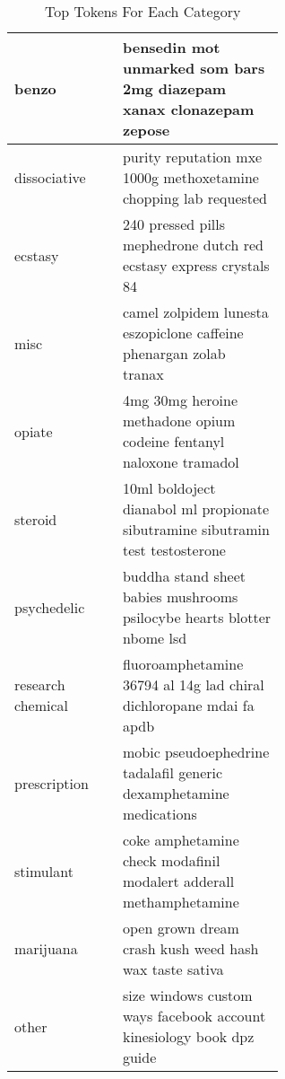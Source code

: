 \begin{table}[!ht]
    \begin{center}
        \begin{tabular}{| l | p{0.6\linewidth} |}
        \hline
        benzo & bensedin mot unmarked som bars 2mg diazepam xanax clonazepam zepose \\
        \hline
        dissociative &  purity reputation mxe 1000g methoxetamine chopping lab requested \\
        \hline
        ecstasy & 240 pressed pills mephedrone dutch red ecstasy express crystals 84 \\
        \hline
        misc & camel zolpidem lunesta eszopiclone caffeine phenargan zolab tranax  \\
        \hline
        opiate & 4mg 30mg heroine methadone opium codeine fentanyl naloxone tramadol \\
        \hline
        steroid & 10ml boldoject dianabol ml propionate sibutramine sibutramin test testosterone \\
        \hline
        psychedelic & buddha stand sheet babies mushrooms psilocybe hearts blotter nbome lsd \\
        \hline
        research chemical & fluoroamphetamine 36794 al 14g lad chiral dichloropane mdai fa apdb \\
        \hline
        prescription & mobic pseudoephedrine tadalafil generic dexamphetamine medications \\
        \hline
        stimulant & coke amphetamine check modafinil modalert adderall methamphetamine \\
        \hline
        marijuana & open grown dream crash kush weed hash wax taste sativa \\
        \hline
        other & size windows custom ways facebook account kinesiology book dpz guide \\
        \hline
        \end{tabular}
    \end{center}
    \caption{Top Tokens For Each Category}
    \label{category_tokens_table}
\end{table}

